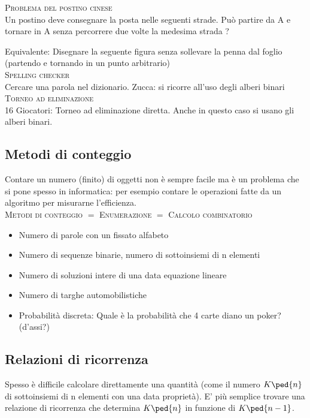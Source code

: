 \documentclass[12pt,a4paper]{article}
\begin{document}
\textsc{Problema del postino cinese} \\
Un postino deve consegnare la posta nelle seguenti strade. Può partire da A e tornare in A senza percorrere due volte
la medesima strada ? \par
Equivalente: Disegnare la seguente figura senza sollevare la penna dal foglio (partendo e tornando in un punto
arbitrario) \\

\textsc{Spelling checker} \\
Cercare una parola nel dizionario. Zucca: si ricorre all'uso degli alberi binari \\

\textsc{Torneo ad eliminazione} \\
16 Giocatori: Torneo ad eliminazione diretta. Anche in questo caso si usano gli alberi binari.

\subsection{Metodi di conteggio} 
Contare un numero (finito) di oggetti non è sempre facile ma è un problema che si pone spesso in
informatica: per esempio contare le operazioni fatte da un algoritmo per misurarne l'efficienza. \\

\textsc{Metodi di conteggio $=$ Enumerazione $=$ Calcolo combinatorio}
 \\

\begin{itemize}
        \item Numero di parole con un fissato alfabeto
\item Numero di sequenze binarie, numero di sottoinsiemi di n elementi
\item Numero di soluzioni intere di una data equazione lineare
\item Numero di targhe automobilistiche
\item Probabilità discreta: Quale è la probabilità che 4 carte diano un poker? (d'assi?)
\end{itemize}

\subsection{Relazioni di ricorrenza}
    Spesso è difficile calcolare direttamente una quantità (come il numero \( K\ped{n}\)
di sottoinsiemi di n
elementi con una data proprietà). E' più semplice trovare una relazione di ricorrenza che
determina \( K\ped{n} \) in funzione di \( K\ped{n-1} \). \\
\end{document}
